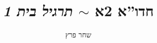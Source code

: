 \documentclass[]{../../../../tex/classes/styledArticle}
\author{שחר פרץ}
\title{חדו''א 2א $\sim$ \textit{תרגיל בית 1}}
\begin{document}
	\maketitle
	
	
	
	\ndoc
\end{document}
